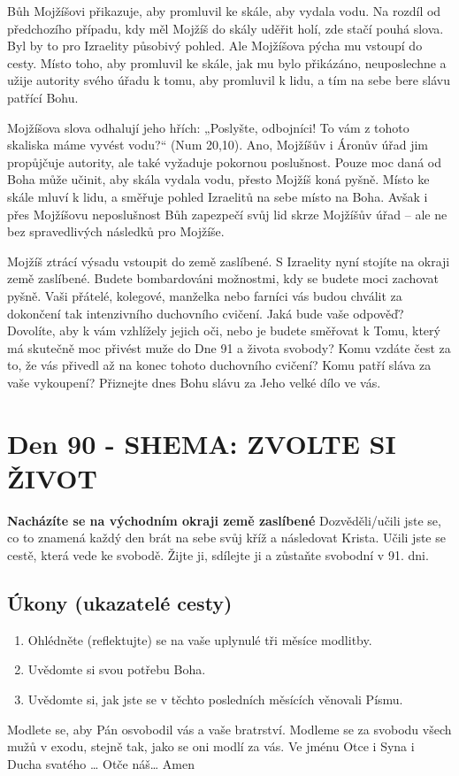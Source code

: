 \documentclass[11pt]{article}
\newcommand{\zacatekTrinactyTyden}{
\textbf{Nacházíte se na východním okraji země zaslíbené} \newline 
Dozvěděli/učili jste se, co to znamená každý den brát na sebe svůj kříž a následovat Krista. Učili jste se cestě, která vede ke svobodě. Žijte ji, sdílejte ji a zůstaňte svobodní v 91. dni.

\subsection*{Úkony (ukazatelé cesty)}
\begin{enumerate}
  \item Ohlédněte (reflektujte) se na vaše uplynulé tři měsíce modlitby.
  \item Uvědomte si svou potřebu Boha.
  \item Uvědomte si, jak jste se v těchto posledních měsících věnovali Písmu.
\end{enumerate}
Modlete se, aby Pán osvobodil vás a vaše bratrství. \newline
Modleme se za svobodu všech mužů v exodu, stejně tak, jako se oni modlí za vás.\newline
Ve jménu Otce i Syna i Ducha svatého …  Otče náš… Amen
}
\begin{document}
Bůh Mojžíšovi přikazuje, aby promluvil ke skále, aby vydala vodu. Na rozdíl od předchozího případu, kdy měl Mojžíš
do skály uděřit holí, zde stačí pouhá slova. Byl by to pro Izraelity působivý pohled. Ale Mojžíšova pýcha mu vstoupí
do cesty. Místo toho, aby promluvil ke skále, jak mu bylo přikázáno, neuposlechne a užije autority svého úřadu k tomu,
aby promluvil k lidu, a tím na sebe bere slávu patřící Bohu.

Mojžíšova slova odhalují jeho hřích: „Poslyšte, odbojníci! To vám z tohoto skaliska máme vyvést vodu?“ (Num
20,10). Ano, Mojžíšův i Áronův úřad jim propůjčuje autority, ale také vyžaduje pokornou poslušnost. Pouze moc daná
od Boha může učinit, aby skála vydala vodu, přesto Mojžíš koná pyšně. Místo ke skále mluví k lidu, a směřuje pohled
Izraelitů na sebe místo na Boha. Avšak i přes Mojžíšovu neposlušnost Bůh zapezpečí svůj lid skrze Mojžíšův úřad –
ale ne bez spravedlivých následků pro Mojžíše.

Mojžíš ztrácí výsadu vstoupit do země zaslíbené. S Izraelity nyní stojíte na okraji země zaslíbené. Budete
bombardováni možnostmi, kdy se budete moci zachovat pyšně. Vaši přátelé, kolegové, manželka nebo farníci vás
budou chválit za dokončení tak intenzivního duchovního cvičení. Jaká bude vaše odpověď? Dovolíte, aby k vám
vzhlížely jejich oči, nebo je budete směřovat k Tomu, který má skutečně moc přivést muže do Dne 91 a života
svobody? Komu vzdáte čest za to, že vás přivedl až na konec tohoto duchovního cvičení? Komu patří sláva za vaše
vykoupení? Přiznejte dnes Bohu slávu za Jeho velké dílo ve vás.


\newpage
\section{Den 90 - SHEMA: ZVOLTE SI ŽIVOT }
\zacatekTrinactyTyden
\end{document}
